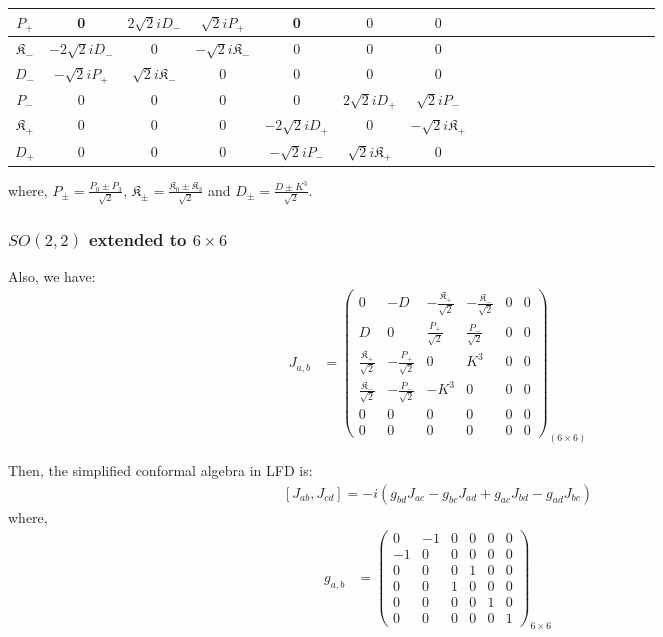 \documentclass[]{article}
\numberwithin{equation}{section}
\begin{document}
{{\begin{table}[h!]
{\begin{tabular}{ |c||c|c|c|c|c|c|c|c|c|c|c|c|c|c|c|c|c|c|c| }
 \hline
  \hline
 \rule{0pt}{16pt}  $P_{{+}}$ &0&$2\sqrt{2}iD_{-}$&$\sqrt{2}iP_{+}$&0&$0$&$0$\\
 \hline 
 \rule{0pt}{16pt}$\mathfrak{K}_{{-}}$ &$-2\sqrt{2}iD_{-}$&$0$&$-\sqrt{2}i\mathfrak{K}_{{-}}$&0&0&$0$\\
 \hline 
  \rule{0pt}{16pt}$D_{-}$ &$-\sqrt{2}iP_{{+}}$&$\sqrt{2}i\mathfrak{K}_{{-}}$&$0$&$0$&0&0\\
 \hline
 \rule{0pt}{16pt}$P_{{-}}$ &0&0&0&$0$&$2\sqrt{2}iD_{+}$&$\sqrt{2}iP_{{-}}$\\
 \hline 
 \rule{0pt}{16pt}$\mathfrak{K}_{{+}}$ &$0$&$0$&0&$-2\sqrt{2}iD_{+}$&0&$-\sqrt{2}i\mathfrak{K}_{{+}}$\\
 \hline 
 \rule{0pt}{16pt}$D_{+}$ &$0$&$0$&0&$-\sqrt{2}iP_{{-}}$&$\sqrt{2}i\mathfrak{K}_{{+}}$&0\\
 \hline 
\end{tabular}}
\end{table}

where, $P_{\pm}=\frac{P_{0}\pm P_{3}}{\sqrt{2}}$, $\mathfrak{K}_{\pm}=\frac{\mathfrak{K}_{0}\pm \mathfrak{K}_{3}}{\sqrt{2}}$ and $D_{\pm}=\frac{D\pm{K^{3}}}{\sqrt{2}}$.

\subsubsection{$SO(2,2)$ extended to $6\times6$}
Also, we have:
\begin{align}
    J_{{a},{b}}&=\begin{pmatrix}
    0&-D&-\frac{\mathfrak{K}_{{+}}}{\sqrt{2}}&-\frac{\mathfrak{K}_{{-}}}{\sqrt{2}}&0&0\\
    D&0&\frac{P_{{+}}}{\sqrt{2}}&\frac{P_{{-}}}{\sqrt{2}}&0&0\\
    \frac{\mathfrak{K}_{{+}}}{\sqrt{2}}&-\frac{P_{{+}}}{\sqrt{2}}&0  & K^3&0&0\\
    \frac{\mathfrak{K}_{{-}}}{\sqrt{2}}&-\frac{P_{{-}}}{\sqrt{2}}&-K^3  & 0&0&0\\
    0&0&0&0&0&0\\
    0&0&0&0&0&0
  \end{pmatrix}_{(6\times6)}
\end{align}

Then, the simplified conformal algebra in LFD is:
  \begin{align}
      \left[J_{{{a}}{{b}}},J_{{{c}}{{d}}}\right]=-i\left(g_{{{b}}{{d}}}J_{{{a}}{{c}}}-g_{{{b}}{{c}}}J_{{{a}}{{d}}}+g_{{{a}}{{c}}}J_{{{b}}{{d}}}-g_{{{a}}{{d}}}J_{{{b}}{{c}}}\right)\label{simplesrint}
  \end{align}
where, 
\begin{align}
    g_{{a},{b}}&=\begin{pmatrix}
  0&-1&0&0&0&0\\
  -1&0&0&0&0&0\\
  0&0&0&1&0&0\\
  0&0&1&0&0&0\\
    0&0&0&0&1&0\\
    0&0&0&0&0&1
  \end{pmatrix}_{6\times6}
\end{align}

}}
\end{document}
